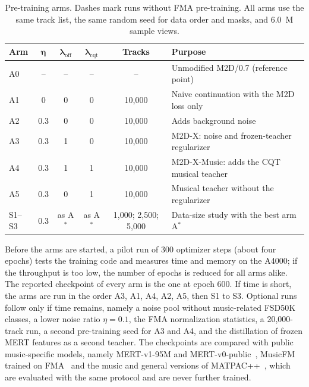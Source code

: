 \documentclass{FastFyp}
\begin{document}
\begin{table}[htbp]
\centering
\caption[Pre-training arms]{Pre-training arms. Dashes mark runs without FMA pre-training. All arms use the same track list, the same random seed for data order and masks, and 6.0~M sample views.}
\label{tab:m5-arms}
\small\singlespacing
\begin{tabularx}{\linewidth}{>{\raggedright\arraybackslash}p{1.1cm}ccccY}
\toprule
\textbf{Arm} & $\boldsymbol{\eta}$ & $\boldsymbol{\lambda_{\mathrm{off}}}$ & $\boldsymbol{\lambda_{\mathrm{cqt}}}$ & \textbf{Tracks} & \textbf{Purpose}\\
\midrule
A0 & -- & -- & -- & -- & Unmodified M2D/0.7 (reference point)\\
A1 & 0 & 0 & 0 & 10,000 & Naive continuation with the M2D loss only\\
A2 & 0.3 & 0 & 0 & 10,000 & Adds background noise\\
A3 & 0.3 & 1 & 0 & 10,000 & M2D-X: noise and frozen-teacher regularizer\\
A4 & 0.3 & 1 & 1 & 10,000 & M2D-X-Music: adds the CQT musical teacher\\
A5 & 0.3 & 0 & 1 & 10,000 & Musical teacher without the regularizer\\
S1--S3 & 0.3 & as A$^{*}$ & as A$^{*}$ & 1,000; 2,500; 5,000 & Data-size study with the best arm A$^{*}$\\
\bottomrule
\end{tabularx}
\end{table}

Before the arms are started, a pilot run of 300 optimizer steps (about four epochs) tests the training code and measures time and memory on the A4000; if the throughput is too low, the number of epochs is reduced for all arms alike. The reported checkpoint of every arm is the one at epoch 600. If time is short, the arms are run in the order A3, A1, A4, A2, A5, then S1 to S3. Optional runs follow only if time remains, namely a noise pool without music-related FSD50K classes, a lower noise ratio $\eta=0.1$, the FMA normalization statistics, a 20,000-track run, a second pre-training seed for A3 and A4, and the distillation of frozen MERT features as a second teacher. The checkpoints are compared with public music-specific models, namely MERT-v1-95M and MERT-v0-public~\cite{ref:Li:2024mert,ref:MERTCard}, MusicFM trained on FMA~\cite{ref:Won:2024musicfm} and the music and general versions of MATPAC++~\cite{ref:Quelennec:2025matpacpp}, which are evaluated with the same protocol and are never further trained.
\end{document}
